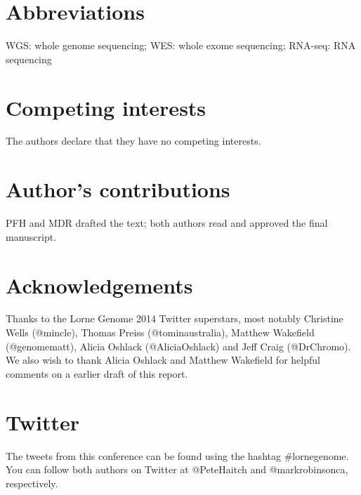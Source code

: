 \documentclass[twocolumn]{bmcart}%
\begin{document}
\begin{backmatter}

\section*{Abbreviations}
WGS: whole genome sequencing; WES: whole exome sequencing; RNA-seq: RNA sequencing

\section*{Competing interests}
  The authors declare that they have no competing interests.

\section*{Author's contributions}
PFH and MDR drafted the text; both authors read and approved the final manuscript.

\section*{Acknowledgements}
Thanks to the Lorne Genome 2014 Twitter superstars, most notably Christine Wells (@mincle), Thomas Preiss (@tominaustralia), Matthew Wakefield (@genomematt), Alicia Oshlack (@AliciaOshlack) and Jeff Craig (@DrChromo).  We also wish to thank Alicia Oshlack and Matthew Wakefield for helpful comments on a earlier draft of this report.

\section*{Twitter}
The tweets from this conference can be found using the hashtag \#lornegenome. You can follow both authors on Twitter at @PeteHaitch and @markrobinsonca, respectively.



\end{backmatter}
\end{document}
